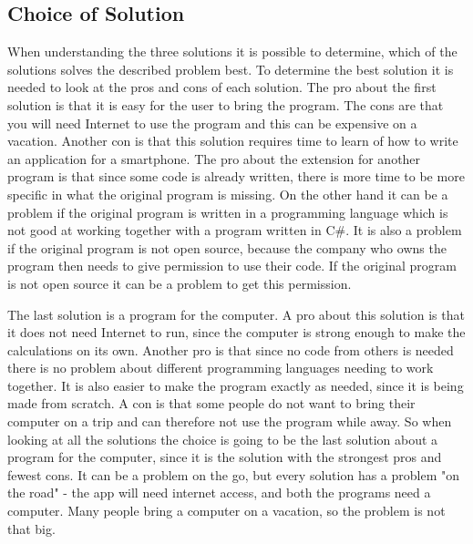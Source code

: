 \subsection{Choice of Solution}
When understanding the three solutions it is possible to determine, which of the solutions solves the described problem best. To determine the best solution it is needed to look at the pros and cons of each solution. The pro about the first solution is that it is easy for the user to bring the program. The cons are that you will need Internet to use the program and this can be expensive on a vacation. Another con is that this solution requires time to learn of how to write an application for a smartphone.
The pro about the extension for another program is that since some code is already written, there is more time to be more specific in what the original program is missing. On the other hand it can be a problem if the original program is written in a programming language which is not good at working together with a program written in C\#. It is also a problem if the original program is not open source, because the company who owns the program then needs to give permission to use their code. If the original program is not open source it can be a problem to get this permission. 

The last solution is a program for the computer. A pro about this solution is that it does not need Internet to run, since the computer is strong enough to make the calculations on its own. Another pro is that since no code from others is needed there is no problem about different programming languages needing to work together. It is also easier to make the program exactly as needed, since it is being made from scratch. A con is that some people do not want to bring their computer on a trip and can therefore not use the program while away. So when looking at all the solutions the choice is going to be the last solution about a program for the computer, since it is the solution with the strongest pros and fewest cons. It can be a problem on the go, but every solution has a problem "on the road" - the app will need internet access, and both the programs need a computer. Many people bring a computer on a vacation, so the problem is not that big.